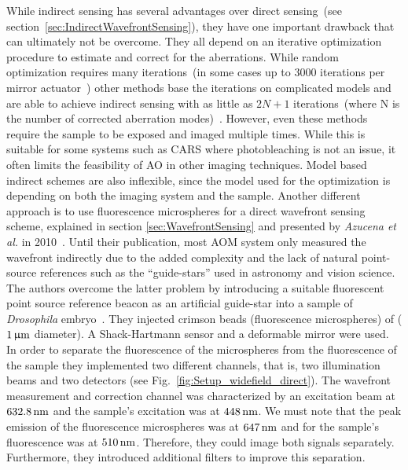 While indirect sensing has several advantages over direct sensing~(see section~\ref{sec:IndirectWavefrontSensing}), they have one important drawback that can ultimately not be overcome. They all depend on an iterative optimization procedure to estimate and correct for the aberrations. While random optimization requires many iterations~(in some cases up to 3000 iterations per mirror actuator~\cite{scan_CARS}) other methods base the iterations on complicated models and are able to achieve indirect sensing with as little as $2N+1$ iterations~(where N is the number of corrected aberration modes)~\cite{wide_AOM_loew_freq,wide_AOM_structured_illu,scan_TPFM_image_based}. However, even these methods require the sample to be exposed and imaged multiple times. While this is suitable for some systems such as CARS where photobleaching is not an issue, it often limits the feasibility of AO in other imaging techniques. Model based indirect schemes are also inflexible, since the model used for the optimization is depending on both the imaging system and the sample. Another different approach is to use fluorescence microspheres for a direct wavefront sensing scheme, explained in section \ref{sec:WavefrontSensing} and presented by \emph{Azucena et al.} in 2010~\cite{wide_fluorescence_guide_star}. Until their publication, most AOM system only measured the wavefront indirectly due to the added complexity and the lack of natural point-source references such as the ``guide-stars'' used in astronomy and vision science. The authors overcome the latter problem by introducing a suitable fluorescent point source reference beacon as an artificial guide-star into a sample of \emph{Drosophila} embryo~\cite{wide_directSensing_microscope}. They injected crimson beads (fluorescence microspheres) of ($\unit[1]{\upmu m}$ diameter). A Shack-Hartmann sensor and a deformable mirror were used. In order to separate the fluorescence of the microspheres from the fluorescence of the sample they implemented two different channels, that is, two illumination beams and two detectors (see Fig.~\ref{fig:Setup_widefield_direct}). The wavefront measurement and correction channel was characterized by an excitation beam at $\unit[632.8]{nm}$ and the sample's excitation was at $\unit[448]{nm}$. We must note that the peak emission of the fluorescence microspheres was at $\unit[647]{nm}$ and for the sample's fluorescence was at $\unit[510]{nm}$. Therefore, they could image both signals separately. Furthermore, they introduced additional filters to improve this separation.

